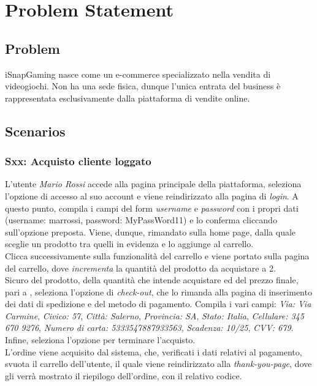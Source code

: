 \documentclass[12pt, a4paper, oneside]{book}
\begin{document}
    \setcounter{tocdepth}{3} %

    \tableofcontents

    \chapter*{Problem Statement}
    \section*{Problem}
        iSnapGaming nasce come un e-commerce specializzato nella vendita di videogiochi. Non ha una sede fisica, dunque l'unica entrata del business è rappresentata esclusivamente dalla piattaforma di vendite online.

    \section*{Scenarios}
    \subsection*{Sxx: Acquisto cliente loggato}
        L'utente \textit{Mario Rossi} accede alla pagina principale della piattaforma, seleziona l'opzione di accesso al suo account e viene reindirizzato alla pagina di \textit{login}.
        A questo punto, compila i campi del form \textit{username} e \textit{password} con i propri dati (username: marrossi, password: MyPassWord11) e lo conferma cliccando sull'opzione preposta.
        Viene, dunque, rimandato sulla home page, dalla quale sceglie un prodotto tra quelli in evidenza e lo aggiunge al carrello.\\
        Clicca successivamente sulla funzionalità del carrello e viene portato sulla pagina del carrello, dove \textit{incrementa} la quantità del prodotto da acquistare a 2.\\
        Sicuro del prodotto, della quantità che intende acquistare ed del prezzo finale, pari a , seleziona l'opzione di \textit{check-out}, che lo rimanda
        alla pagina di inserimento dei dati di spedizione e del metodo di pagamento. Compila i vari campi: \textit{Via: Via Carmine}, \textit{Civico: 57}, \textit{Città: Salerno}, \textit{Provincia: SA}, \textit{Stato: Italia}, \textit{Cellulare: 345 670 9276}, \textit{Numero di carta: 5333547887933563}, \textit{Scadenza: 10/25}, \textit{CVV: 679}. Infine, seleziona l'opzione per terminare l'acquisto.\\
        L'ordine viene acquisito dal sistema, che, verificati i dati relativi al pagamento, svuota il carrello dell'utente, il quale viene reindirizzato alla
        \textit{thank-you-page}, dove gli verrà mostrato il riepilogo dell'ordine, con il relativo codice.
\end{document}
